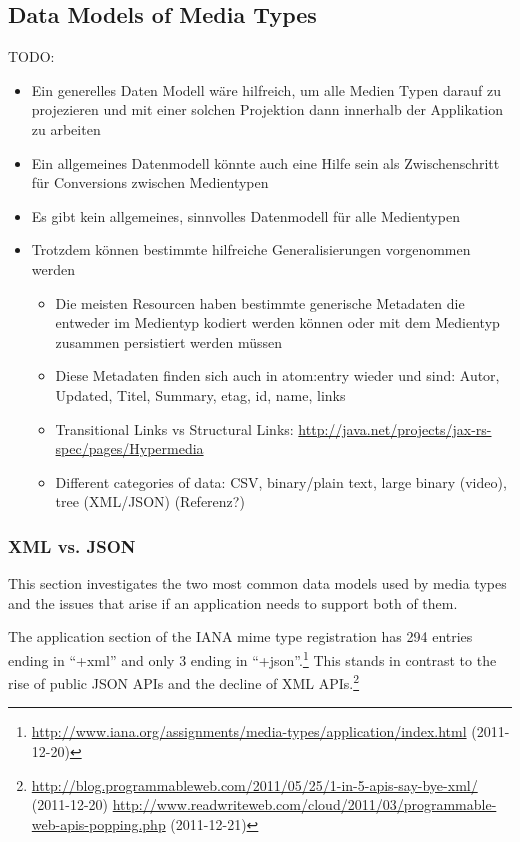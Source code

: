 \documentclass[12pt,a4paper]{scrartcl}		%
\newcommand{\citeurl}[2]{\url{#1} (#2)}
\begin{document}
\subsection{Data Models of Media Types}

TODO:
\begin{itemize}
\item Ein generelles Daten Modell wäre hilfreich, um alle Medien Typen darauf zu projezieren und mit einer solchen Projektion dann innerhalb der Applikation zu arbeiten
\item Ein allgemeines Datenmodell könnte auch eine Hilfe sein als Zwischenschritt für Conversions zwischen Medientypen
\item Es gibt kein allgemeines, sinnvolles Datenmodell für alle Medientypen
\item Trotzdem können bestimmte hilfreiche Generalisierungen vorgenommen werden
  \begin{itemize}
  \item Die meisten Resourcen haben bestimmte generische Metadaten die entweder im Medientyp kodiert werden können oder mit dem Medientyp zusammen persistiert werden müssen
  \item Diese Metadaten finden sich auch in atom:entry wieder und sind: Autor, Updated, Titel, Summary, etag, id, name, links
  \item Transitional Links vs Structural Links: \url{http://java.net/projects/jax-rs-spec/pages/Hypermedia}
  \item Different categories of data: CSV, binary/plain text, large binary (video), tree (XML/JSON) (Referenz?)


  \end{itemize}
\end{itemize}

\subsubsection{XML vs. JSON}

This section investigates the two most common data models used by media types
and the issues that arise if an application needs to support both of them.

The application section of the IANA mime type registration has 294 entries
ending in ``+xml'' and only 3 ending in
``+json''.\footnote{\citeurl{http://www.iana.org/assignments/media-types/application/index.html}{2011-12-20}}
This stands in contrast to the rise of public JSON APIs and the decline of XML
APIs.\footnote{\citeurl{http://blog.programmableweb.com/2011/05/25/1-in-5-apis-say-bye-xml/}{2011-12-20} \citeurl{http://www.readwriteweb.com/cloud/2011/03/programmable-web-apis-popping.php}{2011-12-21}}
\end{document}
